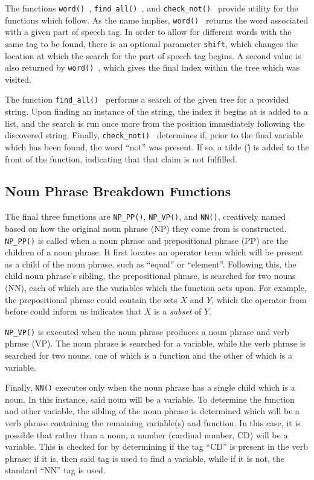The functions \texttt{word() }, \texttt{find\_all() }, and \texttt{check\_not() } provide utility for the functions which follow. As the name implies, \texttt{word() } returns the word associated with a given part of speech tag. In order to allow for different words with the same tag to be found, there is an optional parameter \texttt{shift}, which changes the location at which the search for the part of speech tag begins. A second value is also returned by \texttt{word() }, which gives the final index within the tree which was visited.

The function \texttt{find\_all() } performs a search of the given tree for a provided string. Upon finding an instance of the string, the index it begins at is added to a list, and the search is run once more from the position immediately following the discovered string. Finally, \texttt{check\_not() } determines if, prior to the final variable which has been found, the word ``not'' was present. If so, a tilde (\~) is added to the front of the function, indicating that that claim is not fulfilled.

\subsection{Noun Phrase Breakdown Functions}

The final three functions are \texttt{NP\_PP()}, \texttt{NP\_VP()}, and \texttt{NN()}, creatively named based on how the original noun phrase (NP) they come from is constructed. \texttt{NP\_PP()} is called when a noun phrase and prepositional phrase (PP) are the children of a noun phrase. It first locates an operator term which will be present as a child of the noun phrase, such as ``equal'' or ``element''. Following this, the child noun phrase's sibling, the prepositional phrase, is searched for two nouns (NN), each of which are the variables which the function acts upon. For example, the prepositional phrase could contain the sets $X$ and $Y$, which the operator from before could inform us indicates that $X$ is a \textit{subset} of $Y$.

\texttt{NP\_VP()} is executed when the noun phrase produces a noun phrase and verb phrase (VP). The noun phrase is searched for a variable, while the verb phrase is searched for two nouns, one of which is a function and the other of which is a variable.

Finally, \texttt{NN()} executes only when the noun phrase has a single child which is a noun. In this instance, said noun will be a variable. To determine the function and other variable, the sibling of the noun phrase is determined which will be a verb phrase containing the remaining variable(s) and function. In this case, it is possible that rather than a noun, a number (cardinal number, CD) will be a variable. This is checked for by determining if the tag ``CD'' is present in the verb phrase; if it is, then said tag is used to find a variable, while if it is not, the standard ``NN'' tag is used.

